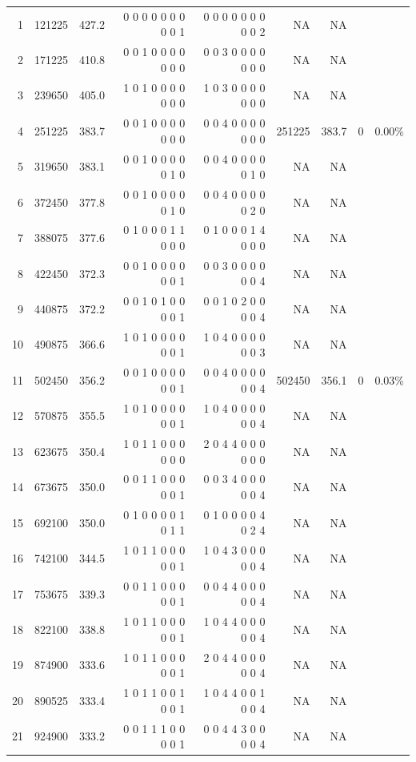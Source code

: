 \documentclass[10pt,journal,compsoc]{IEEEtran}
\begin{document}
\begin{table}[ht]
{\begin{tabular}{|*{9}{r|}}
1	&121225	&   427.2	&0 0 0 0 0 0 0 0 0 1	&0 0 0 0 0 0 0 0 0 2	&			NA	&NA&&\\
2	&171225	&   410.8	&0 0 1 0 0 0 0 0 0 0	&0 0 3 0 0 0 0 0 0 0	&			NA	&NA&&\\
3	&239650	&   405.0	&1 0 1 0 0 0 0 0 0 0	&1 0 3 0 0 0 0 0 0 0	&			NA	&NA&&\\
4	&251225	&   383.7	&0 0 1 0 0 0 0 0 0 0	&0 0 4 0 0 0 0 0 0 0	&	      \cellcolor{blizzardblue} 251225&	\cellcolor{blizzardblue}383.7	&\cellcolor{blizzardblue}0	&\cellcolor{blizzardblue}0.00\%\\
5	&319650	&   383.1	&0 0 1 0 0 0 0 0 1 0	&0 0 4 0 0 0 0 0 1 0	&			NA	&NA&&\\
6	&372450	&   377.8	&0 0 1 0 0 0 0 0 1 0	&0 0 4 0 0 0 0 0 2 0	&			NA	&NA&&\\
7	&388075	&   377.6	&0 1 0 0 0 1 1 0 0 0	&0 1 0 0 0 1 4 0 0 0	&			NA	&NA&&\\
8	&422450	&   372.3	&0 0 1 0 0 0 0 0 0 1	&0 0 3 0 0 0 0 0 0 4	&			NA	&NA&&\\
9	&440875	&   372.2	&0 0 1 0 1 0 0 0 0 1	&0 0 1 0 2 0 0 0 0 4	&			NA	&NA&&\\
10	&490875	&   366.6	&1 0 1 0 0 0 0 0 0 1	&1 0 4 0 0 0 0 0 0 3	&			NA	&NA&&\\
11	&502450	&   356.2	&0 0 1 0 0 0 0 0 0 1	&0 0 4 0 0 0 0 0 0 4	&	      \cellcolor{blizzardblue} 502450	&\cellcolor{blizzardblue}356.1	&\cellcolor{blizzardblue}0	&\cellcolor{blizzardblue}0.03\%\\
12	&570875	&   355.5	&1 0 1 0 0 0 0 0 0 1	&1 0 4 0 0 0 0 0 0 4	&			NA	&NA&&\\
13	&623675	&   350.4	&1 0 1 1 0 0 0 0 0 0	&2 0 4 4 0 0 0 0 0 0	&			NA	&NA&&\\
14	&673675	&   350.0	&0 0 1 1 0 0 0 0 0 1	&0 0 3 4 0 0 0 0 0 4	&			NA	&NA&&\\
15	&692100	&   350.0	&0 1 0 0 0 0 1 0 1 1	&0 1 0 0 0 0 4 0 2 4	&			NA	&NA&&\\
16	&742100	&   344.5	&1 0 1 1 0 0 0 0 0 1	&1 0 4 3 0 0 0 0 0 4	&			NA	&NA&&\\
17	&753675	&   339.3	&0 0 1 1 0 0 0 0 0 1	&0 0 4 4 0 0 0 0 0 4	&			NA	&NA&&\\
18	&822100	&   338.8	&1 0 1 1 0 0 0 0 0 1	&1 0 4 4 0 0 0 0 0 4	&			NA	&NA&&\\
19	&874900	&   333.6	&1 0 1 1 0 0 0 0 0 1	&2 0 4 4 0 0 0 0 0 4	&			NA	&NA&&\\
20	&890525	&   333.4	&1 0 1 1 0 0 1 0 0 1	&1 0 4 4 0 0 1 0 0 4	&			NA	&NA&&\\
21	&924900	&   333.2	&0 0 1 1 1 0 0 0 0 1	&0 0 4 4 3 0 0 0 0 4	&			NA	&NA&&\\

\end{tabular}}
\end{table}
\end{document}
